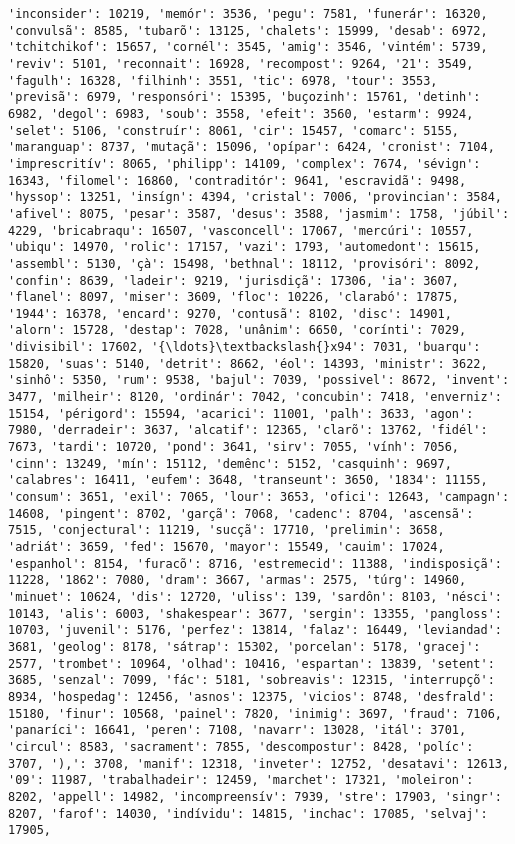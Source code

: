 \documentclass[11pt]{article}
\begin{document}
\begin{Verbatim}[commandchars=\\\{\}]
'inconsider': 10219, 'memór': 3536, 'pegu': 7581, 'funerár': 16320, 'convulsã': 8585, 'tubarõ': 13125, 'chalets': 15999, 'desab': 6972, 'tchitchikof': 15657, 'cornél': 3545, 'amig': 3546, 'vintém': 5739, 'reviv': 5101, 'reconnait': 16928, 'recompost': 9264, '21': 3549, 'fagulh': 16328, 'filhinh': 3551, 'tic': 6978, 'tour': 3553, 'previsã': 6979, 'responsóri': 15395, 'buçozinh': 15761, 'detinh': 6982, 'degol': 6983, 'soub': 3558, 'efeit': 3560, 'estarm': 9924, 'selet': 5106, 'construír': 8061, 'cir': 15457, 'comarc': 5155, 'maranguap': 8737, 'mutaçã': 15096, 'opípar': 6424, 'cronist': 7104, 'imprescritív': 8065, 'philipp': 14109, 'complex': 7674, 'sévign': 16343, 'filomel': 16860, 'contraditór': 9641, 'escravidã': 9498, 'hyssop': 13251, 'insígn': 4394, 'cristal': 7006, 'provincian': 3584, 'afivel': 8075, 'pesar': 3587, 'desus': 3588, 'jasmim': 1758, 'júbil': 4229, 'bricabraqu': 16507, 'vasconcell': 17067, 'mercúri': 10557, 'ubiqu': 14970, 'rolic': 17157, 'vazi': 1793, 'automedont': 15615, 'assembl': 5130, 'çà': 15498, 'bethnal': 18112, 'provisóri': 8092, 'confin': 8639, 'ladeir': 9219, 'jurisdiçã': 17306, 'ia': 3607, 'flanel': 8097, 'miser': 3609, 'floc': 10226, 'clarabó': 17875, '1944': 16378, 'encard': 9270, 'contusã': 8102, 'disc': 14901, 'alorn': 15728, 'destap': 7028, 'unânim': 6650, 'corínti': 7029, 'divisibil': 17602, '{\ldots}\textbackslash{}x94': 7031, 'buarqu': 15820, 'suas': 5140, 'detrit': 8662, 'éol': 14393, 'ministr': 3622, 'sinhô': 5350, 'rum': 9538, 'bajul': 7039, 'possivel': 8672, 'invent': 3477, 'milheir': 8120, 'ordinár': 7042, 'concubin': 7418, 'enverniz': 15154, 'périgord': 15594, 'acarici': 11001, 'palh': 3633, 'agon': 7980, 'derradeir': 3637, 'alcatif': 12365, 'clarõ': 13762, 'fidél': 7673, 'tardi': 10720, 'pond': 3641, 'sirv': 7055, 'vính': 7056, 'cinn': 13249, 'mín': 15112, 'demênc': 5152, 'casquinh': 9697, 'calabres': 16411, 'eufem': 3648, 'transeunt': 3650, '1834': 11155, 'consum': 3651, 'exil': 7065, 'lour': 3653, 'ofici': 12643, 'campagn': 14608, 'pingent': 8702, 'garçã': 7068, 'cadenc': 8704, 'ascensã': 7515, 'conjectural': 11219, 'sucçã': 17710, 'prelimin': 3658, 'adriát': 3659, 'fed': 15670, 'mayor': 15549, 'cauim': 17024, 'espanhol': 8154, 'furacõ': 8716, 'estremecid': 11388, 'indisposiçã': 11228, '1862': 7080, 'dram': 3667, 'armas': 2575, 'túrg': 14960, 'minuet': 10624, 'dis': 12720, 'uliss': 139, 'sardôn': 8103, 'nésci': 10143, 'alis': 6003, 'shakespear': 3677, 'sergin': 13355, 'pangloss': 10703, 'juvenil': 5176, 'perfez': 13814, 'falaz': 16449, 'leviandad': 3681, 'geolog': 8178, 'sátrap': 15302, 'porcelan': 5178, 'gracej': 2577, 'trombet': 10964, 'olhad': 10416, 'espartan': 13839, 'setent': 3685, 'senzal': 7099, 'fác': 5181, 'sobreavis': 12315, 'interrupçõ': 8934, 'hospedag': 12456, 'asnos': 12375, 'vicios': 8748, 'desfrald': 15180, 'finur': 10568, 'painel': 7820, 'inimig': 3697, 'fraud': 7106, 'panaríci': 16641, 'peren': 7108, 'navarr': 13028, 'itál': 3701, 'circul': 8583, 'sacrament': 7855, 'descompostur': 8428, 'políc': 3707, '),': 3708, 'manif': 12318, 'inveter': 12752, 'desatavi': 12613, '09': 11987, 'trabalhadeir': 12459, 'marchet': 17321, 'moleiron': 8202, 'appell': 14982, 'incompreensív': 7939, 'stre': 17903, 'singr': 8207, 'farof': 14030, 'indívidu': 14815, 'inchac': 17085, 'selvaj': 17905, 
\end{Verbatim}
\end{document}
